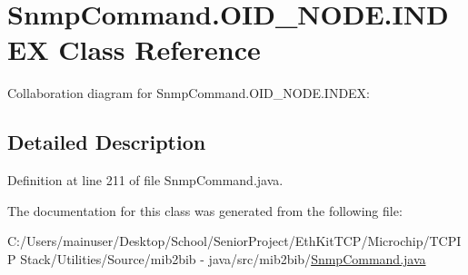 \hypertarget{classmib2bib_1_1_snmp_command_1_1_o_i_d___n_o_d_e_1_1_i_n_d_e_x}{}\section{Snmp\+Command.\+O\+I\+D\+\_\+\+N\+O\+D\+E.\+I\+N\+D\+E\+X Class Reference}
\label{classmib2bib_1_1_snmp_command_1_1_o_i_d___n_o_d_e_1_1_i_n_d_e_x}


Collaboration diagram for Snmp\+Command.\+O\+I\+D\+\_\+\+N\+O\+D\+E.\+I\+N\+D\+E\+X\+:


\subsection{Detailed Description}


Definition at line 211 of file Snmp\+Command.\+java.



The documentation for this class was generated from the following file\+:\begin{DoxyCompactItemize}
\item 
C\+:/\+Users/mainuser/\+Desktop/\+School/\+Senior\+Project/\+Eth\+Kit\+T\+C\+P/\+Microchip/\+T\+C\+P\+I\+P Stack/\+Utilities/\+Source/mib2bib -\/ java/src/mib2bib/\hyperlink{_snmp_command_8java}{Snmp\+Command.\+java}\end{DoxyCompactItemize}
